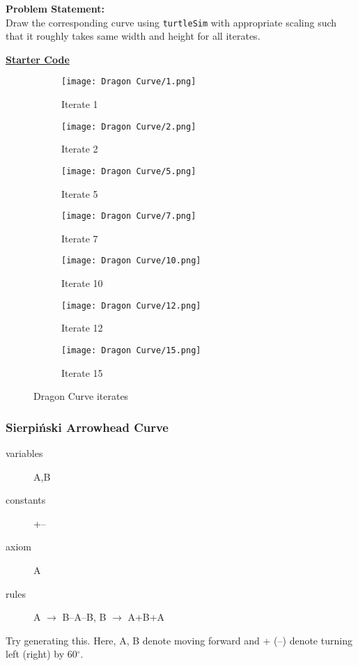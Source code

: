 \documentclass[../../Problems]{subfiles}
\begin{document}
\textbf{Problem Statement:}\\
Draw the corresponding curve using \verb!turtleSim! with appropriate scaling such that it roughly takes same width and height for all iterates.
\begin{tcolorbox}%
	\href{https://github.com/paramrathour/CS-101/tree/main/Starter Codes/Dragon Curve.cpp}{\textbf{Starter Code}}
\end{tcolorbox}
\begin{figure}[H]
	\centering
	\begin{subfigure}{0.1\linewidth}
		\texttt{[image: Dragon Curve/1.png]}
		\caption{Iterate 1}
	\end{subfigure}
	\begin{subfigure}{0.08\linewidth}
		\texttt{[image: Dragon Curve/2.png]}
		\caption{Iterate 2}
	\end{subfigure}
	\begin{subfigure}{0.12\linewidth}
		\texttt{[image: Dragon Curve/5.png]}
		\caption{Iterate 5}
	\end{subfigure}
	\begin{subfigure}{0.16\linewidth}
		\texttt{[image: Dragon Curve/7.png]}
		\caption{Iterate 7}
	\end{subfigure}
	\begin{subfigure}{0.09\linewidth}
		\texttt{[image: Dragon Curve/10.png]}
		\caption{Iterate 10}
	\end{subfigure}
	\begin{subfigure}{0.18\linewidth}
		\texttt{[image: Dragon Curve/12.png]}
		\caption{Iterate 12}
	\end{subfigure}
	\begin{subfigure}{0.18\linewidth}
		\texttt{[image: Dragon Curve/15.png]}
		\caption{Iterate 15}
	\end{subfigure}
	\caption{Dragon Curve iterates}
\end{figure}
\vspace{-2em}
\subsubsection{Sierpi\'nski Arrowhead Curve}{\label{pp:sierpinskicurve}}
\begin{description}
	\item[variables] A,B
	\item[constants] +--
	\item[axiom] A
	\item[rules] A $\rightarrow$ B--A--B, B $\rightarrow$ A+B+A
\end{description}
Try generating this. Here, A, B denote moving forward and + (--) denote turning left (right) by 60$^\circ$.
\end{document}
